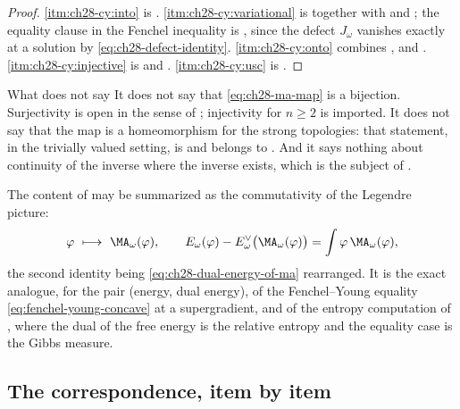 \begin{proof}
\cref{itm:ch28-cy:into} is .
\cref{itm:ch28-cy:variational} is
 together with
 and
; the equality clause in the
Fenchel inequality is , since the defect
\(J_\omega\) vanishes exactly at a solution by
\eqref{eq:ch28-defect-identity}.  \cref{itm:ch28-cy:onto} combines
,
 and
.  \cref{itm:ch28-cy:injective} is
 and
.  \cref{itm:ch28-cy:usc} is
.
\end{proof}

\begin{warning}{What  does not say}
It does not say that \eqref{eq:ch28-ma-map} is a bijection.  Surjectivity is
open in the sense of ; injectivity for
\(n\geq2\) is imported.  It does not say that the map is a homeomorphism for
the strong topologies: that statement, in the trivially valued setting, is
\cite[Theorem~12.8]{BJ22} and belongs to
.  And it says nothing about continuity of
the inverse where the inverse exists, which is the subject of
.
\end{warning}

\begin{remark}
\label{rem:ch28-correspondence-line}
The content of  may be summarized as the
commutativity of the Legendre picture:
\[
 \varphi\ \longmapsto\ \MA_\omega(\varphi),
 \qquad
 E_\omega(\varphi)-E^\vee_\omega\bigl(\MA_\omega(\varphi)\bigr)
 =\int\varphi\,\MA_\omega(\varphi),
\]
the second identity being \eqref{eq:ch28-dual-energy-of-ma} rearranged.  It
is the exact analogue, for the pair (energy, dual energy), of the
Fenchel--Young equality \eqref{eq:fenchel-young-concave} at a supergradient,
and of the entropy computation of , where the
dual of the free energy is the relative entropy and the equality case is the
Gibbs measure.
\end{remark}

\subsection{The correspondence, item by item}
\label{sec:ch28-cy-table}

